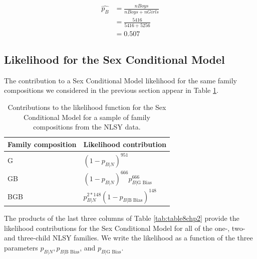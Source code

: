 \documentclass[
]{krantz}
\newcommand{\neutral}{p_{B|N}}
\newcommand{\gbias}{p_{B|\textrm{G Bias}}}
\newcommand{\bbias}{p_{B|\textrm{B Bias}}}
\begin{document}
\begin{equation*}
\begin{split}
 \hat{p_B} &= \frac{nBoys}{nBoys + nGirls} \\
 & =  \frac{5416}{5416+5256} \\
 &= 0.507
\end{split}
\end{equation*}

\hypertarget{sex-cond-lik}{%
\subsection{Likelihood for the Sex Conditional Model}\label{sex-cond-lik}}

The contribution to a Sex Conditional Model likelihood for the same family compositions we considered in the previous section appear in Table \ref{tab:sexcondmodel}.

\begin{table}

\caption{\label{tab:sexcondmodel}Contributions to the likelihood function for the Sex Conditional Model for a sample of family compositions from the NLSY data.}
\centering
\begin{tabular}[t]{>{\raggedright\arraybackslash}p{5cm}>{\raggedright\arraybackslash}p{5cm}}
\toprule
Family composition & Likelihood contribution\\
\midrule
G & $(1-\neutral)^{951}$\\
GB & $(1-\neutral)^{666}\gbias^{666}$\\
BGB & $\neutral^{2*148}(1-\bbias)^{148}$\\
\bottomrule
\end{tabular}
\end{table}

The products of the last three columns of Table \ref{tab:table8chp2} provide the likelihood contributions for the Sex Conditional Model for all of the one-, two- and three-child NLSY families. We write the likelihood as a function of the three parameters \(\neutral, \bbias\), and \(\gbias\).
\end{document}
